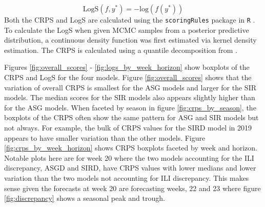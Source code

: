 \documentclass[ba]{imsart}
\theoremstyle{plain}
\theoremstyle{definition}
\theoremstyle{remark}
\begin{document}
\begin{equation}
    \text{LogS}(f, y^*) = -\text{log}(f(y^*))
    \label{eq:logs2}
\end{equation}
Both the CRPS and LogS are calculated using the \texttt{scoringRules} package in \texttt{R} \cite[]{jordan2019scoring}.
To calculate the LogS when given MCMC samples from a posterior predictive distribution, a continuous density function was first estimated via kernel density estimation. The CRPS is calculated using a quantile decomposition from \cite[]{laio2007verification}. 





Figures \ref{fig:overall_scores} - \ref{fig:logs_by_week_horizon} show boxplots of the CRPS and LogS for the four models. Figure \ref{fig:overall_scores} shows that the variation of overall CRPS is smallest for the ASG models and larger for the SIR models. The median scores for the SIR models also appears slightly higher than for the ASG models. 
When faceted by season in figure \ref{fig:crps_by_season}, the boxplots of the CRPS often show the same pattern for ASG and SIR models but not always. For example, the bulk of CRPS values for the SIRD model in 2019 appears to have smaller variation than the other models.
Figure \ref{fig:crps_by_week_horizon} shows CRPS boxplots faceted by week and horizon. Notable plots here are for week 20 where the two models accounting for the ILI discrepancy, ASGD and SIRD, have CRPS values with lower medians and lower variation than the two models not accounting for ILI discrepancy. This makes sense given the forecasts at week 20 are forecasting weeks, 22 and 23 where figure \ref{fig:discrepancy} shows a seasonal peak and trough. 
\end{document}
